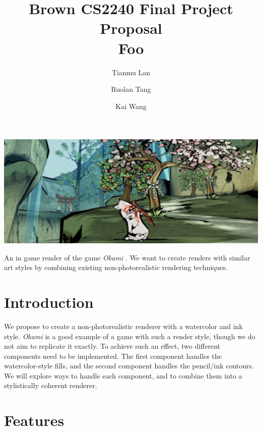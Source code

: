 \documentclass[acmtog, table, dvipsnames]{acmart}
\begin{document}
\title{\textbf{Brown CS2240 Final Project Proposal} \\
       Foo}
\author{Tianmu Lan}
\author{Ruolan Tang}
\author{Kai Wang}
\begin{teaserfigure}
  \centering
  \includegraphics[width=\linewidth]{okami.jpg}
  \caption{An in game render of the game \textit{Okami} \cite{Okami}. We want to create renders with similar art styles by combining existing non-photorealistic rendering techniques.}
\end{teaserfigure}

\maketitle

\section{Introduction}

We propose to create a non-photorealistic renderer with a watercolor and ink style. \textit{Okami} \cite{Okami} is a good example of a game with such a render style, though we do not aim to replicate it exactly. To achieve such an effect, two different components need to be implemented. The first component handles the watercolor-style fills, and the second component handles the pencil/ink contours. We will explore ways to handle each component, and to combine them into a stylistically coherent renderer.

\section{Features}
\end{document}
